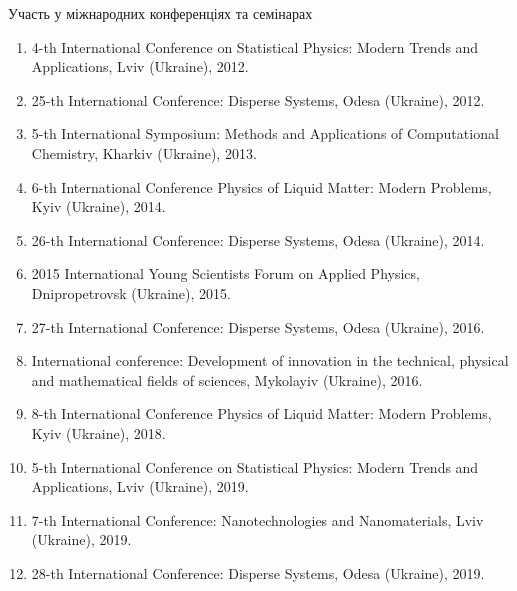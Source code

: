 \documentclass[10pt]{beamer}
\begin{document}
\begin{frame}{Участь у міжнародних конференціях та семінарах}
\vspace{-5pt}
{\footnotesize
\begin{enumerate}
\item 4-th International Conference on Statistical Physics: Modern Trends and Applications, Lviv (Ukraine), 2012.

\item 25-th International Conference: Disperse Systems, Odesa (Ukraine), 2012.

\item 5-th International Symposium: Methods and Applications of Computational Chemistry,  Kharkiv (Ukraine), 2013.

\item 6-th International Conference Physics  of  Liquid  Matter:  Modern Problems,  Kyiv (Ukraine), 2014.

\item 26-th International Conference: Disperse Systems,  Odesa (Ukraine), 2014.

\item 2015 International Young Scientists Forum on Applied Physics,  Dnipropetrovsk (Ukraine), 2015.

\item 27-th International Conference: Disperse Systems, Odesa (Ukraine), 2016.

\item International conference: Development of innovation in the technical, physical and mathematical fields of sciences, Mykolayiv (Ukraine), 2016.

\item 8-th International  Conference Physics  of  Liquid  Matter: Modern Problems, Kyiv (Ukraine), 2018.

\item 5-th International Conference on Statistical Physics: Modern Trends and Applications, Lviv (Ukraine), 2019.

\item 7-th International Conference: Nano\-technologies and Nanomaterials,  Lviv (Ukraine), 2019.

\item 28-th International Conference: Disperse Systems, Odesa (Ukraine), 2019.
\end{enumerate}
}

\end{frame}
\end{document}
